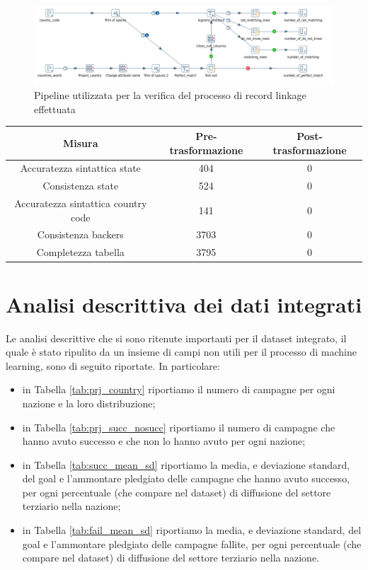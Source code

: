 \begin{figure}[h!]
	\centering
	\includegraphics[width=1\linewidth]{images/QDT_recordlinkage}
	\caption{Pipeline utilizzata per la verifica del processo di record linkage effettuata}
	\label{fig:qdtrecordlinkage}
\end{figure}


\begin{tabular}{|c|c|c|}
	\hline 
	Misura & Pre-trasformazione & Post-trasformazione \\ 
	\hline 
	Accuratezza sintattica state & 404 & 0 \\ 
	\hline 
	Consistenza state & 524 & 0 \\ 
	\hline 
	Accuratezza sintattica country code & 141 & 0 \\ 
	\hline 
	Consistenza backers & 3703 & 0 \\ 
	\hline 
	Completezza tabella & 3795 & 0 \\ 
	\hline 
\end{tabular} 

\section{Analisi descrittiva dei dati integrati}
Le analisi descrittive che si sono ritenute importanti per il dataset integrato, il quale è stato ripulito da un insieme di campi non utili per il processo di machine learning, sono di seguito riportate.
In particolare:
\begin{itemize}
	\item in Tabella \ref{tab:prj_country} riportiamo il numero di campagne per ogni nazione e la loro distribuzione;
	\item in Tabella \ref{tab:prj_succ_nosucc} riportiamo il numero di campagne che hanno avuto successo e che non lo hanno avuto per ogni nazione;
	\item in Tabella \ref{tab:succ_mean_sd} riportiamo la media, e deviazione standard, del goal e l'ammontare pledgiato delle campagne che hanno avuto successo, per ogni percentuale (che compare nel dataset) di diffusione del settore terziario nella nazione; 
	\item in Tabella \ref{tab:fail_mean_sd} riportiamo la media, e deviazione standard, del goal e l'ammontare pledgiato delle campagne fallite, per ogni percentuale (che compare nel dataset) di diffusione del settore terziario nella nazione.
\end{itemize} 

